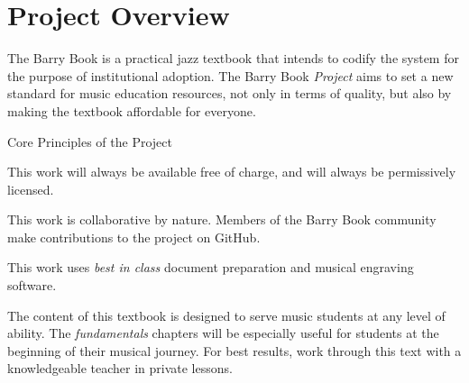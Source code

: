 \section{Project Overview}

The Barry Book is a practical jazz textbook that intends to codify the \BarryFull system for the purpose of institutional adoption. The Barry Book \emph{Project} aims to set a new standard for music education resources, not only in terms of quality, but also by making the textbook affordable for everyone. 

\begin{bookStyledList}{Core Principles of the Project}
\item This work will always be available free of charge, and will always be permissively licensed.
\item This work is collaborative by nature. Members of the Barry Book community make contributions to the project on GitHub.
\item This work uses \emph{best in class} document preparation and musical engraving software.
\end{bookStyledList}

The content of this textbook is designed to serve music students at any level of ability. The \emph{fundamentals} chapters will be especially useful for students at the beginning of their musical journey. For best results, work through this text with a knowledgeable teacher in private lessons.
